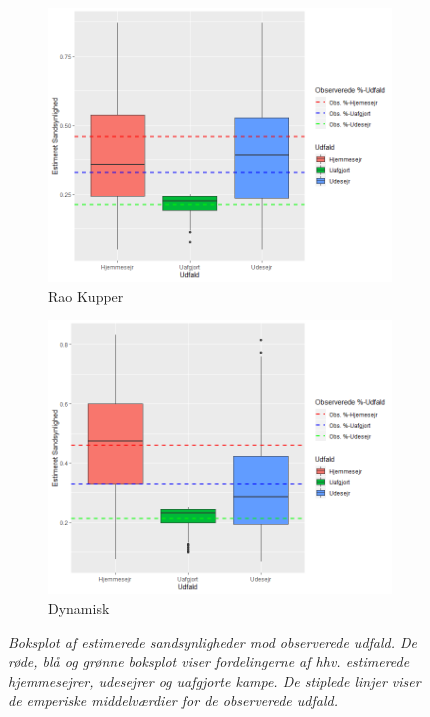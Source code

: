 \documentclass[11pt,a4paper]{article}
\begin{document}
\begin{figure}[h!]
  \centering
  \begin{subfigure}[b]{0.475\linewidth}
    \includegraphics[width=\linewidth]{EstSSHStatisk.png}
    \caption{Rao Kupper}
    \label{fig:boxplotS}
  \end{subfigure}
  \begin{subfigure}[b]{0.475\linewidth}
    \includegraphics[width=\linewidth]{EstSSHDyn.png}
    \caption{Dynamisk}
    \label{fig:boxplotD}
  \end{subfigure}
  \caption{\textit{Boksplot af estimerede sandsynligheder mod observerede udfald. De røde, blå og grønne boksplot viser fordelingerne af hhv. estimerede hjemmesejrer, udesejrer og uafgjorte kampe. De stiplede linjer viser de emperiske middelværdier for de observerede udfald.}}
  \label{fig:boxplot}
\end{figure}
\end{document}
